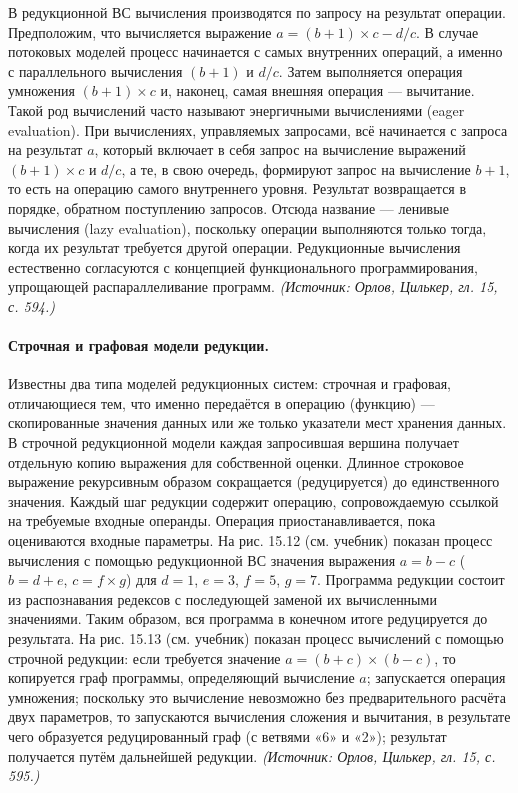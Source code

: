 \documentclass[a4paper,12pt]{article}
\begin{document}
В редукционной ВС вычисления производятся по запросу на результат операции. Предположим, что вычисляется выражение \(a=(b+1)\times c-d/c\). В случае потоковых моделей процесс начинается с самых внутренних операций, а именно с параллельного вычисления \((b+1)\) и \(d/c\). Затем выполняется операция умножения \((b+1)\times c\) и, наконец, самая внешняя операция — вычитание. Такой род вычислений часто называют энергичными вычислениями (eager evaluation). При вычислениях, управляемых запросами, всё начинается с запроса на результат \(a\), который включает в себя запрос на вычисление выражений \((b+1)\times c\) и \(d/c\), а те, в свою очередь, формируют запрос на вычисление \(b+1\), то есть на операцию самого внутреннего уровня. Результат возвращается в порядке, обратном поступлению запросов. Отсюда название — ленивые вычисления (lazy evaluation), поскольку операции выполняются только тогда, когда их результат требуется другой операции. Редукционные вычисления естественно согласуются с концепцией функционального программирования, упрощающей распараллеливание программ.
\textit{(Источник: Орлов, Цилькер, гл. 15, с. 594.)}

\paragraph{Строчная и графовая модели редукции.}
Известны два типа моделей редукционных систем: строчная и графовая, отличающиеся тем, что именно передаётся в операцию (функцию) — скопированные значения данных или же только указатели мест хранения данных. В строчной редукционной модели каждая запросившая вершина получает отдельную копию выражения для собственной оценки. Длинное строковое выражение рекурсивным образом сокращается (редуцируется) до единственного значения. Каждый шаг редукции содержит операцию, сопровождаемую ссылкой на требуемые входные операнды. Операция приостанавливается, пока оцениваются входные параметры. На рис. 15.12 (см. учебник) показан процесс вычисления с помощью редукционной ВС значения выражения \(a=b-c\) (\(b=d+e\), \(c=f\times g\)) для \(d=1\), \(e=3\), \(f=5\), \(g=7\). Программа редукции состоит из распознавания редексов с последующей заменой их вычисленными значениями. Таким образом, вся программа в конечном итоге редуцируется до результата. На рис. 15.13 (см. учебник) показан процесс вычислений с помощью строчной редукции: если требуется значение \(a=(b+c)\times(b-c)\), то копируется граф программы, определяющий вычисление \(a\); запускается операция умножения; поскольку это вычисление невозможно без предварительного расчёта двух параметров, то запускаются вычисления сложения и вычитания, в результате чего образуется редуцированный граф (с ветвями «6» и «2»); результат получается путём дальнейшей редукции.
\textit{(Источник: Орлов, Цилькер, гл. 15, с. 595.)}
\end{document}
